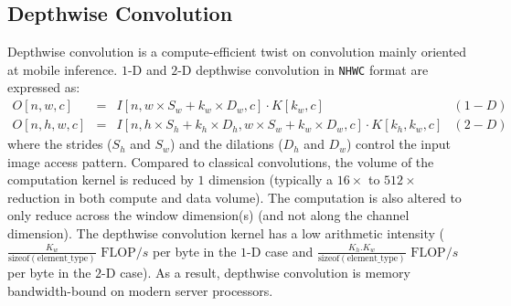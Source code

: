 \subsection{Depthwise Convolution}

Depthwise convolution is a compute-efficient twist on convolution mainly oriented at mobile inference.
$1$-D and $2$-D depthwise convolution in \lstinline|NHWC| format are expressed as:
\begin{equation*}
\begin{array}{llll}
O[n,w,c] &=& I[n,w\times S_w+k_w\times D_w,c]\cdot K[k_w,c] & (1-D) \\
O[n,h,w,c] &=& I[n,h\times S_h+k_h\times D_h,w\times S_w+k_w\times D_w,c]\cdot K[k_h,k_w,c] & (2-D)
\end{array}
\end{equation*}
where the strides ($S_h$ and $S_w$) and the dilations ($D_h$ and $D_w$) control the input image access pattern. 
Compared to classical convolutions, the volume of the computation kernel is reduced by $1$ dimension (typically a $16\times$ to $512\times$ reduction in both compute and data volume).
The computation is also altered to only reduce across the window dimension(s) (and not along the channel dimension).
The depthwise convolution kernel has a low arithmetic intensity ($\frac{K_w}{\mathrm{sizeof}(\mathrm{element\_type})}$ $\mathrm{FLOP}/s$ per byte in the $1$-D case and $\frac{K_h.K_w}{\mathrm{sizeof}(\mathrm{element\_type})}$ $\mathrm{FLOP}/s$ per byte in the $2$-D case).
As a result, depthwise convolution is memory bandwidth-bound on modern server processors.

